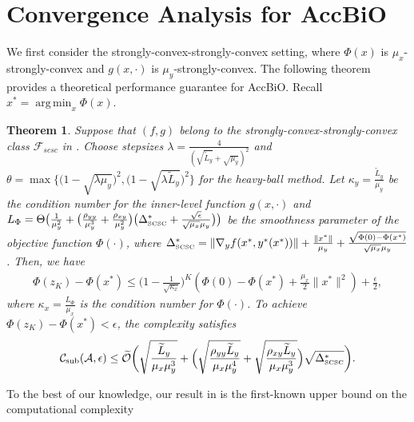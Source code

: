 \documentclass{osudissert96}
\DeclareMathOperator*{\argmin}{arg\,min}
\newtheorem{theorem}{Theorem}
\begin{document}
\section{Convergence Analysis for AccBiO}\label{sec:caoaccsas}	
We first consider the strongly-convex-strongly-convex setting, where $\Phi(x)$ is $\mu_x$-strongly-convex and $g(x,\cdot)$ is $\mu_y$-strongly-convex. 
 The following theorem provides a theoretical performance guarantee for AccBiO. Recall $x^*=\argmin_{x}\Phi(x)$.
\begin{theorem}\label{upper_srsr_withnoB}  
Suppose that $(f,g)$ belong to the strongly-convex-strongly-convex class $\mathcal{F}_{scsc}$ in . Choose stepsizes {\small $\lambda=\frac{4}{(\sqrt{\widetilde L_y}+\sqrt{\mu_y})^2}$} and {\small $\theta=\max\big\{\big(1-\sqrt{\lambda\mu_y}\big)^2,\big(1-\sqrt{\lambda\widetilde L_y}\big)^2\big\}$} for the heavy-ball method.  Let $\kappa_y=\frac{\widetilde L_y}{\mu_y}$ be the condition number for the inner-level function $g(x,\cdot)$ and $L_\Phi =\Theta\big(\frac{1}{\mu_y^2}+\big(\frac{ \rho_{yy}}{\mu_y^3} +  \frac{\rho_{xy}}{\mu_y^2}\big)\big(\Delta^*_{\text{\normalfont\tiny SCSC}}+\frac{\sqrt{\epsilon}}{\sqrt{\mu_x}\mu_y}\big) \big) $ be the smoothness parameter of the objective function $\Phi(\cdot)$, where $\Delta^*_{\text{\normalfont\tiny SCSC}}=\|\nabla_y f( x^*,y^*(x^*))\|+\frac{\|x^*\|}{\mu_y}+\frac{\sqrt{\Phi(0)-\Phi(x^*)}}{\sqrt{\mu_x}\mu_y}$. Then, we have 
\begin{align*}
\Phi(z_K)- \Phi(x^*)\leq  \Big(1 -\frac{1}{\sqrt{\kappa_x}} \Big)^{K}(\Phi(0) -\Phi(x^*)+\frac{\mu_x}{2} \|x^*\|^2) +\frac{\epsilon}{2},
\end{align*}
where $\kappa_x=\frac{L_\Phi}{\mu_x}$ is the condition number for $\Phi(\cdot)$. To achieve $\Phi(z_K)- \Phi(x^*)<\epsilon$, the complexity satisfies 
\begin{align}\label{mybabasohotssca1}
\mathcal{C}_{\text{\normalfont sub}}(\mathcal{A},\epsilon)\leq \mathcal{\widetilde O}\bigg(\sqrt{\frac{\widetilde L_y}{\mu_x\mu_y^{3}}}+\Big(\sqrt{\frac{ \rho_{yy}\widetilde L_y}{\mu_x\mu_y^{4}} }+ \sqrt{ \frac{\rho_{xy}\widetilde L_y}{\mu_x\mu_y^{3}}}\Big)\sqrt{\Delta^*_{\text{\normalfont\tiny SCSC}}}\bigg).
\end{align}
\end{theorem}	
To the best of our knowledge, our result in  is the first-known upper bound on the computational complexity 
\end{document}
